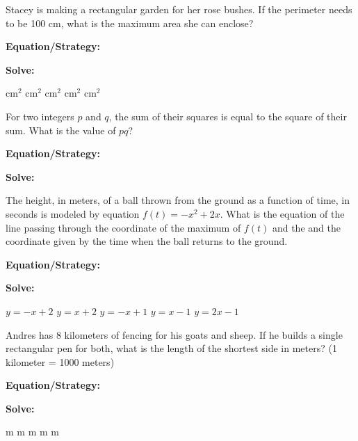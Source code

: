 \vfill
\newpage
\begin{multicols}{2}
\begin{outline}[enumerate]
\medium

\1 Stacey is making a rectangular garden for her rose bushes. If the perimeter needs to be 100 cm, what is the maximum area she can enclose?

\bigskip
\textbf{Equation/Strategy:} \hrulefill

\bigskip
\textbf{Solve:}

\vfill
{} cm$^2$
 cm$^2$
 cm$^2$
 cm$^2$
 cm$^2$

\midline

\1 For two integers $p$ and $q$, the sum of their squares is equal to the square of their sum. What is the value of $pq$?

\bigskip
\textbf{Equation/Strategy:} \hrulefill

\bigskip
\textbf{Solve:}

\vfill
{}

\columnbreak
\advanced

\1 The height, in meters, of a ball thrown from the ground as a function of time, in seconds is modeled by equation $f(t)=-x^2+2x$. What is the equation of the line passing through the coordinate of the maximum of $f(t)$ and the and the coordinate given by the time when the ball returns to the ground.

\bigskip
\textbf{Equation/Strategy:} \hrulefill

\bigskip
\textbf{Solve:}

\vfill
\2 $y=-x+2$
\2 $y=x+2$
\2 $y=-x+1$
\2 $y=x-1$
\2 $y=2x-1$

\midline

\1 Andres has 8 kilometers of fencing for his goats and sheep. If he builds a single rectangular pen for both, what is the length of the shortest side in meters? (1 kilometer = 1000 meters)

\bigskip
\textbf{Equation/Strategy:} \hrulefill

\bigskip
\textbf{Solve:}

\vfill
{} m
 m
 m
 m
 m
\end{outline}
\end{multicols}